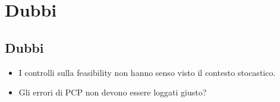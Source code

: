 \chapter{Dubbi}

\section{Dubbi}
\begin{itemize}
    \item I controlli sulla feasibility non hanno senso visto il contesto stocastico.
    \item Gli errori di PCP non devono essere loggati giusto?
\end{itemize}